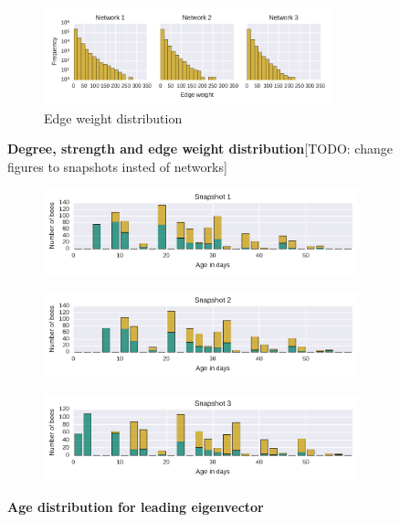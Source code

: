 \begin{figure}[!t]
	\centering	
	\begin{subfigure}[b]{1.0\textwidth}
	\centering
	\includegraphics[width=0.92\textwidth]{Figures/stat-edgeWeightDist}
	\caption[Edge weight distribution]{Edge weight distribution}
	\label{fig:statEdgeWeightDist}
	\end{subfigure}
	\caption[Degree, strength and edge weight distribution]{\textbf{Degree, strength and edge weight distribution}[TODO: change figures to snapshots insted of networks]}
	\label{fig:distributions}
\end{figure}

\begin{figure}[htb]
\centering
	\begin{subfigure}[b]{1.0\textwidth}
	\centering
	\includegraphics[width=1.0\textwidth]{Figures/n1-ageDistribution-LE}
	\end{subfigure}
	\begin{subfigure}[b]{1.0\textwidth}
	\centering
	\includegraphics[width=1.0\textwidth]{Figures/n2-ageDistribution-LE}
	\end{subfigure}
	\begin{subfigure}[b]{1.0\textwidth}
	\centering
	\includegraphics[width=1.0\textwidth]{Figures/n3-ageDistribution-LEAppendix}
	\end{subfigure}
	\caption[Age distribution for leading eigenvector]{\textbf{Age distribution for leading eigenvector}}
	\label{fig:ageDistLE}	
\end{figure}


